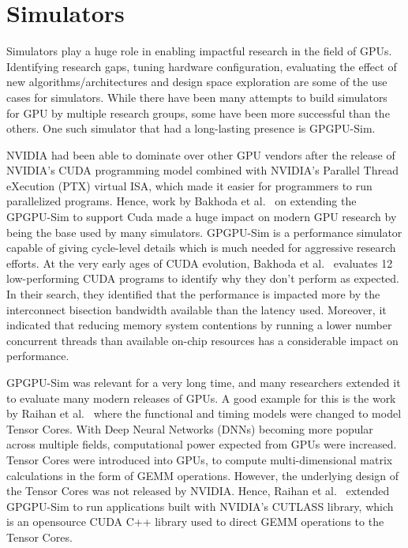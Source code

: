 \section{Simulators}

Simulators play a huge role in enabling impactful research in the field of GPUs.
Identifying research gaps, tuning hardware configuration, evaluating the effect of new algorithms/architectures and design space exploration are some of the use cases for simulators.
While there have been many attempts to build simulators for GPU by multiple research groups, some have been more successful than the others.
One such simulator that had a long-lasting presence is GPGPU-Sim.

NVIDIA had been able to dominate over other GPU vendors after the release of NVIDIA's CUDA programming model combined with NVIDIA's Parallel Thread eXecution (PTX) virtual ISA, which made it easier for programmers to run parallelized programs.
Hence, work by Bakhoda et al.~\cite{Bakhoda2009} on extending the GPGPU-Sim to support Cuda made a huge impact on modern GPU research by being the base used by many simulators.
GPGPU-Sim is a performance simulator capable of giving cycle-level details which is much needed for aggressive research efforts.
At the very early ages of CUDA evolution, Bakhoda et al.~\cite{Bakhoda2009} evaluates 12 low-performing CUDA programs to identify why they don't perform as expected.
In their search, they identified that the performance is impacted more by the interconnect bisection bandwidth available than the latency used.
Moreover, it indicated that reducing memory system contentions by running a lower number concurrent threads than available on-chip resources has a considerable impact on performance.~\cite{Bakhoda2009}

GPGPU-Sim was relevant for a very long time, and many researchers extended it to evaluate many modern releases of GPUs.
A good example for this is the work by Raihan et al.~\cite{Raihan2018} where the functional and timing models were changed to model Tensor Cores.
With Deep Neural Networks (DNNs) becoming more popular across multiple fields, computational power expected from GPUs were increased.
Tensor Cores were introduced into GPUs, to compute multi-dimensional matrix calculations in the form of GEMM operations.
However, the underlying design of the Tensor Cores was not released by NVIDIA.
Hence, Raihan et al.~\cite{Raihan2018} extended GPGPU-Sim to run applications built with NVIDIA’s CUTLASS library, which is an opensource CUDA C++ library used to direct GEMM operations to the Tensor Cores.

